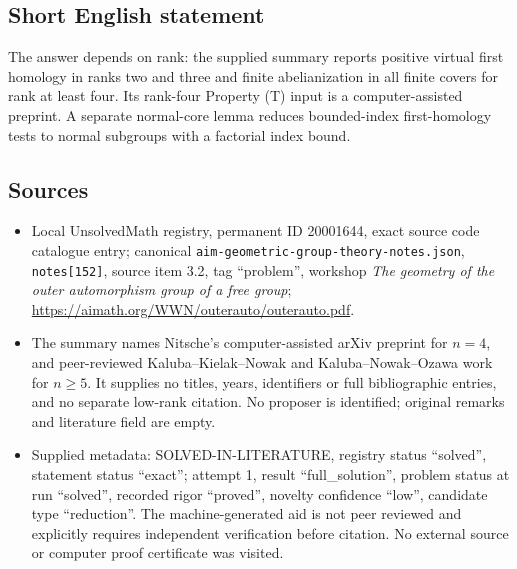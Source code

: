 \documentclass[11pt]{article}
\begin{document}
\subsection{Short English statement}
The answer depends on rank: the supplied summary reports positive virtual first homology in ranks two and three and finite abelianization in all finite covers for rank at least four. Its rank-four Property (T) input is a computer-assisted preprint. A separate normal-core lemma reduces bounded-index first-homology tests to normal subgroups with a factorial index bound.
\subsection{Sources}
\begin{itemize}
\item Local UnsolvedMath registry, permanent ID 20001644, exact source code catalogue entry; canonical \texttt{aim-geometric-group-theory-notes.json}, \texttt{notes[152]}, source item 3.2, tag ``problem'', workshop \emph{The geometry of the outer automorphism group of a free group}; \url{https://aimath.org/WWN/outerauto/outerauto.pdf}.
\item The summary names Nitsche's computer-assisted arXiv preprint for $n=4$, and peer-reviewed Kaluba--Kielak--Nowak and Kaluba--Nowak--Ozawa work for $n\geq5$. It supplies no titles, years, identifiers or full bibliographic entries, and no separate low-rank citation. No proposer is identified; original remarks and literature field are empty.
\item Supplied metadata: SOLVED-IN-LITERATURE, registry status ``solved'', statement status ``exact''; attempt 1, result ``full\_solution'', problem status at run ``solved'', recorded rigor ``proved'', novelty confidence ``low'', candidate type ``reduction''. The machine-generated aid is not peer reviewed and explicitly requires independent verification before citation. No external source or computer proof certificate was visited.
\end{itemize}
\end{document}
